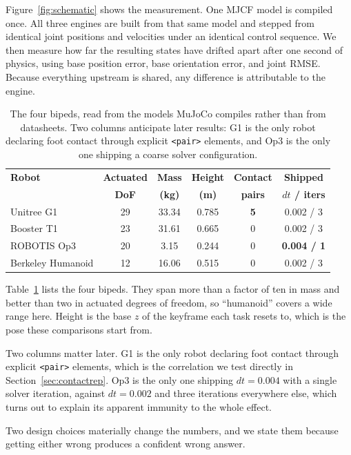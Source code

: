 \documentclass[conference]{IEEEtran}
\newcommand{\tabfont}{\footnotesize}
\begin{document}
Figure~\ref{fig:schematic} shows the measurement. One MJCF model is
compiled once. All three engines are built from that same model and
stepped from identical joint positions and velocities under an identical
control sequence. We then measure how far the resulting states have
drifted apart after one second of physics, using base position error,
base orientation error, and joint RMSE. Because everything upstream is
shared, any difference is attributable to the engine.

\begin{table}[t]
\caption{The four bipeds, read from the models MuJoCo compiles rather than
from datasheets. Two columns anticipate later results: G1 is the only robot
declaring foot contact through explicit \texttt{<pair>} elements, and Op3 is
the only one shipping a coarse solver configuration.}
\label{tab:robots}
\centering
\tabfont
\begin{tabular}{@{}lccccc@{}}
\toprule
\textbf{Robot} & \textbf{Actuated} & \textbf{Mass} & \textbf{Height} &
\textbf{Contact} & \textbf{Shipped} \\
 & \textbf{DoF} & \textbf{(kg)} & \textbf{(m)} & \textbf{pairs} & \textbf{$dt$ / iters} \\
\midrule
Unitree G1        & 29 & 33.34 & 0.785 & \textbf{5} & 0.002 / 3 \\
Booster T1        & 23 & 31.61 & 0.665 & 0 & 0.002 / 3 \\
ROBOTIS Op3       & 20 & \phantom{0}3.15 & 0.244 & 0 & \textbf{0.004 / 1} \\
Berkeley Humanoid & 12 & 16.06 & 0.515 & 0 & 0.002 / 3 \\
\bottomrule
\end{tabular}
\end{table}

Table~\ref{tab:robots} lists the four bipeds. They span more than a factor
of ten in mass and better than two in actuated degrees of freedom, so
``humanoid'' covers a wide range here. Height is the base $z$ of the
keyframe each task resets to, which is the pose these comparisons start
from.

Two columns matter later. G1 is the only robot declaring foot contact
through explicit \verb|<pair>| elements, which is the correlation we test
directly in Section~\ref{sec:contactrep}. Op3 is the only one shipping
$dt=0.004$ with a single solver iteration, against $dt=0.002$ and three
iterations everywhere else, which turns out to explain its apparent
immunity to the whole effect.

Two design choices materially change the numbers, and we state them
because getting either wrong produces a confident wrong answer.
\end{document}
